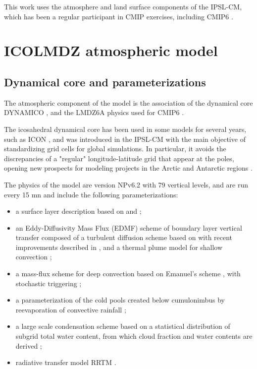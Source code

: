 This work uses the atmosphere and land surface components of the IPSL-CM, which has been a regular participant in CMIP exercises, including CMIP6 \citep{boucher_presentation_2020}. 

\section{ICOLMDZ atmospheric model}
\subsection{Dynamical core and parameterizations}
The atmospheric component of the model is the association of the dynamical core DYNAMICO \citep{dubos_dynamico-10_2015}, and the LMDZ6A physics used for CMIP6 \citep{hourdin_lmdz6a_2020}. 

The icosahedral dynamical core has been used in some models for several years, such as ICON
, and was introduced in the IPSL-CM with the main objective of standardizing grid cells for global simulations. In particular, it avoids the discrepancies of a "regular" longitude-latitude grid that appear at the poles, opening new prospects for modeling projects in the Arctic %
and Antarctic regions %
.

The physics of the model are version NPv6.2 with 79 vertical levels, and are run every 15 mn and include the following parameterizations:
\begin{itemize}
    \item a surface layer description based on \cite{louis_parametric_1979} and \cite{king_sensitivity_2001}; 
    \item an Eddy-Diffusivity Mass Flux (EDMF) scheme of boundary layer vertical transfer composed of a turbulent diffusion scheme based on \cite{yamada_simulations_1983} with recent improvements described in \cite{vignon_modeling_2018}, and a thermal plume model for shallow convection \citep{rio_thermal_2008, hourdin_unified_2019}; 
    \item a mass-flux scheme for deep convection based on Emanuel's scheme \citep{emanuel_scheme_1991, grandpeix_improved_2004, rio_control_2013}, with stochastic triggering \citep{rochetin_deep_2014, rochetin_deep_2014-1}; 
    \item a parameterization of the cold pools created below cumulonimbus by reevaporation of convective rainfall \citep{grandpeix_density_2010-1,grandpeix_density_2010};
    \item a large scale condensation scheme based on a statistical distribution of subgrid total water content, from which cloud fraction and water contents are derived \citep{madeleine_improved_2020}; 
    \item radiative transfer model RRTM \citep{mlawer_radiative_1997}.
\end{itemize}

